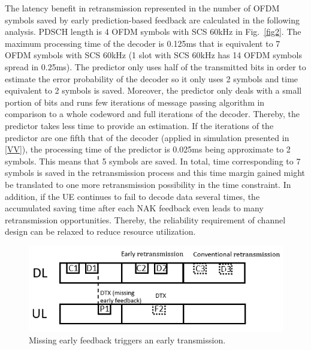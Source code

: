 \documentclass[conference]{IEEEtran}
\begin{document}
The latency benefit in retransmission represented in the number of OFDM symbols saved by early prediction-based feedback are calculated in the following analysis. PDSCH length is 4 OFDM symbols with SCS 60kHz in Fig.~\ref{fig2}. The maximum processing time of the decoder is 0.125ms that is equivalent to 7 OFDM symbols with SCS 60kHz (1 slot with SCS 60kHz has 14 OFDM symbols spread in 0.25ms). The predictor only uses half of the transmitted bits in order to estimate the error probability of the decoder so it only uses 2 symbols and time equivalent to 2 symbols is saved. Moreover, the predictor only deals with a small portion of bits and runs few iterations of message passing algorithm in comparison to a whole codeword and full iterations of the decoder. Thereby, the predictor takes less time to provide an estimation. If the iterations of the predictor are one fifth that of the decoder (applied in simulation presented in \ref{VV}), the processing time of the predictor is 0.025ms being approximate to 2 symbols. This means that 5 symbols are saved. In total, time corresponding to 7 symbols is saved in the retransmission process and this time margin gained  might be translated  to  one more  retransmission  possibility  in the time constraint. In addition, if the UE continues to fail to decode data several times, the accumulated saving time after each NAK feedback even leads to many retransmission opportunities.  Thereby,  the reliability  requirement  of  channel  design  can  be  relaxed to  reduce  resource  utilization. 
\begin{figure}[htbp]
\centerline{\includegraphics[scale=0.38]{fig3.png}}
\caption{Missing early feedback triggers an early transmission.}
\label{fig3}
\end{figure}
\end{document}
